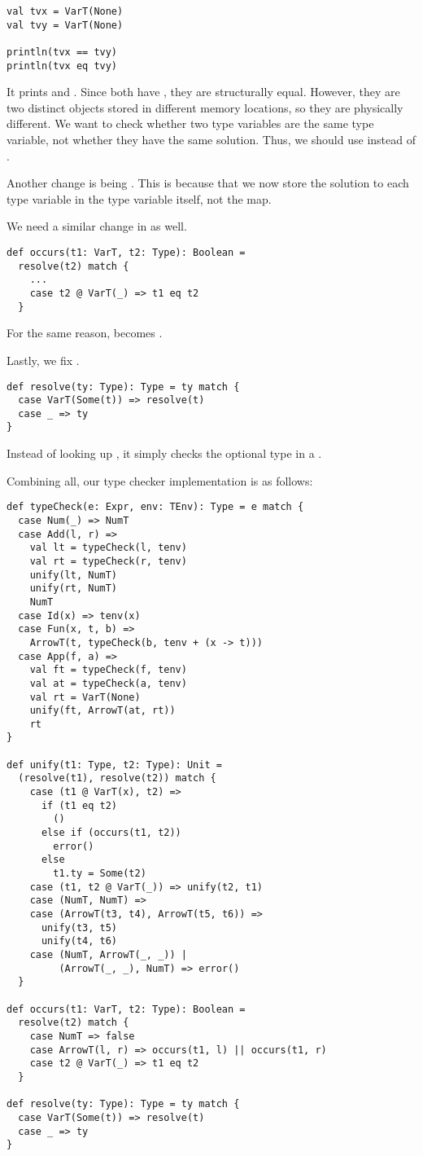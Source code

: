 \begin{verbatim}
val tvx = VarT(None)
val tvy = VarT(None)

println(tvx == tvy)
println(tvx eq tvy)
\end{verbatim}

It prints  and . Since both have , they are
structurally equal. However, they are two distinct  objects stored in
different memory locations, so they are physically different. We want to check
whether two type variables are the same type variable, not whether they have the
same solution. Thus, we should use  instead of \code{==}.

Another change is  being . This is
because that we now store the solution to each type variable in the type
variable itself, not the  map.

We need a similar change in  as well.

\begin{verbatim}
def occurs(t1: VarT, t2: Type): Boolean =
  resolve(t2) match {
    ...
    case t2 @ VarT(_) => t1 eq t2
  }
\end{verbatim}

For the same reason, \code{==} becomes .

Lastly, we fix .

\begin{verbatim}
def resolve(ty: Type): Type = ty match {
  case VarT(Some(t)) => resolve(t)
  case _ => ty
}
\end{verbatim}

Instead of looking up , it simply checks the optional type in a
.

Combining all, our type checker implementation is as follows:

\begin{verbatim}
def typeCheck(e: Expr, env: TEnv): Type = e match {
  case Num(_) => NumT
  case Add(l, r) =>
    val lt = typeCheck(l, tenv)
    val rt = typeCheck(r, tenv)
    unify(lt, NumT)
    unify(rt, NumT)
    NumT
  case Id(x) => tenv(x)
  case Fun(x, t, b) =>
    ArrowT(t, typeCheck(b, tenv + (x -> t)))
  case App(f, a) =>
    val ft = typeCheck(f, tenv)
    val at = typeCheck(a, tenv)
    val rt = VarT(None)
    unify(ft, ArrowT(at, rt))
    rt
}

def unify(t1: Type, t2: Type): Unit =
  (resolve(t1), resolve(t2)) match {
    case (t1 @ VarT(x), t2) =>
      if (t1 eq t2)
        ()
      else if (occurs(t1, t2))
        error()
      else
        t1.ty = Some(t2)
    case (t1, t2 @ VarT(_)) => unify(t2, t1)
    case (NumT, NumT) =>
    case (ArrowT(t3, t4), ArrowT(t5, t6)) =>
      unify(t3, t5)
      unify(t4, t6)
    case (NumT, ArrowT(_, _)) |
         (ArrowT(_, _), NumT) => error()
  }

def occurs(t1: VarT, t2: Type): Boolean =
  resolve(t2) match {
    case NumT => false
    case ArrowT(l, r) => occurs(t1, l) || occurs(t1, r)
    case t2 @ VarT(_) => t1 eq t2
  }

def resolve(ty: Type): Type = ty match {
  case VarT(Some(t)) => resolve(t)
  case _ => ty
}
\end{verbatim}

